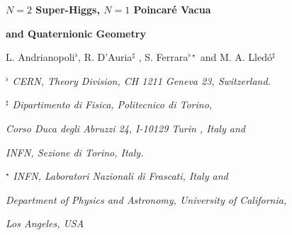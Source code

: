 \documentclass[a4paper,12pt]{article}
\begin{document}

\newcommand{\R}{\mathbb{R}}
\newcommand{\C}{\mathbb{C}}
\newcommand{\Z}{\mathbb{Z}}
\newcommand{\Hb}{\mathbb{H}}

\newcommand{\rE}{\mathrm{E}}
\newcommand{\ii}{\mathrm{i}}
\newcommand{\rSp}{\mathrm{Sp}}
\newcommand{\rSO}{\mathrm{SO}}
\newcommand{\rSL}{\mathrm{SL}}
\newcommand{\rSU}{\mathrm{SU}}
\newcommand{\rUSp}{\mathrm{USp}}
\newcommand{\rU}{\mathrm{U}}
\newcommand{\rF}{\mathrm{F}}
\newcommand{\rGL}{\mathrm{GL}}
\newcommand{\rG}{\mathrm{G}}
\newcommand{\rK}{\mathrm{K}}


\newcommand{\fgl}{\mathfrak{gl}}
\newcommand{\fu}{\mathfrak{u}}
\newcommand{\fsl}{\mathfrak{sl}}
\newcommand{\fsp}{\mathfrak{sp}}
\newcommand{\fusp}{\mathfrak{usp}}
\newcommand{\fsu}{\mathfrak{su}}
\newcommand{\fp}{\mathfrak{p}}
\newcommand{\fso}{\mathfrak{so}}
\newcommand{\fl}{\mathfrak{l}}
\newcommand{\fg}{\mathfrak{g}}
\newcommand{\fr}{\mathfrak{r}}
\newcommand{\fe}{\mathfrak{e}}
\newcommand{\ft}{\mathfrak{t}}
\newcommand{\id}{\relax{\rm 1\kern-.35em 1}}





\vskip 1cm


  \centerline{\LARGE \bf $N=2$ Super-Higgs, $N=1$ Poincar\'e  Vacua}

  \bigskip

   \centerline{\LARGE \bf and Quaternionic Geometry}





 \vskip 1.5cm
\centerline{L. Andrianopoli$^\flat$, R. D'Auria$^\sharp$
,  S.
Ferrara$^{\flat \star}$ and
 M. A. Lled\'o$^\sharp$ }
\vskip 1cm

\centerline{\it $^\flat$ CERN, Theory Division, CH 1211 Geneva 23,
Switzerland.}

\bigskip



\centerline{\it $^\sharp$ Dipartimento di Fisica, Politecnico di
Torino,} \centerline{\it Corso Duca degli Abruzzi 24, I-10129
Turin , Italy  and  } \centerline{\it   INFN, Sezione di Torino,
Italy. }

\bigskip



\centerline{$^\star$ \it INFN, Laboratori
Nazionali di
Frascati, Italy and}
\centerline{\it Department of Physics and Astronomy, University of
California,} \centerline{\it  Los Angeles, USA} 
\end{document}
